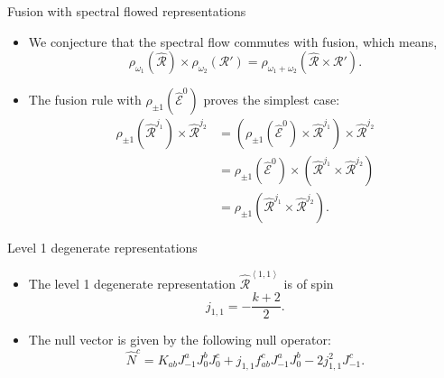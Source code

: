 \documentclass{beamer}
\newcommand{\vev}[1]{\left\langle #1 \right\rangle}
\begin{document}
\begin{frame}{Fusion with spectral flowed representations}
  \begin{itemize}
    \item We conjecture that the spectral flow commutes with fusion, which means, 
      \begin{equation*}
          \rho_{\omega_{1}} \left(\hat{\mathcal{R}}\right) \times \rho_{\omega_{2}} \left(\mathcal{R'}\right) = \rho_{\omega_{1} + \omega_{2}} \left(\hat{\mathcal{R}}\times \mathcal{R'}\right). \label{SpecFus}
      \end{equation*}
    \item The fusion rule with $\rho_{\pm 1} \left(\widehat{\mathcal{E}}^{0}\right)$ proves the simplest case:
      \begin{equation*}
        \begin{aligned}
          \rho_{\pm 1} \left(\widehat{\mathcal{R}}^{j_{1}}\right) \times \widehat{\mathcal{R}}^{j_{2}} 
          &= \left(\rho_{\pm 1} \left( \hat{\mathcal{E}}^{0} \right) \times \widehat{\mathcal{R}}^{j_{1}} \right) \times \widehat{\mathcal{R}}^{j_{2}}\\
          &= \rho_{\pm 1} \left( \hat{\mathcal{E}}^{0} \right) \times \left( \widehat{\mathcal{R}}^{j_{1}}  \times \widehat{\mathcal{R}}^{j_{2}} \right) \\
          &= \rho_{\pm 1} \left(\widehat{\mathcal{R}}^{j_{1}} \times \widehat{\mathcal{R}}^{j_{2}} \right).
        \end{aligned}
      \end{equation*}
  \end{itemize}
\end{frame}

\begin{frame}{Level 1 degenerate representations}
  \begin{itemize}
    \item The level 1 degenerate representation $\widehat{\mathcal{R}}^{\vev{1,1}}$ is of spin 
      \begin{equation*}
        j_{1,1} = -\frac{k+2}{2}.
      \end{equation*}
    \item The null vector is given by the following null operator:
      \begin{equation*}
          \hat{N}^{c} = K_{ab} J^{a}_{-1} J^{b}_{0} J^{c}_{0} + j_{1,1} f^{c}_{ab} J^{a}_{-1} J^{b}_{0} - 2 j^{2}_{1,1} J^{c}_{-1}.
      \end{equation*}
  \end{itemize}
\end{frame}
\end{document}
